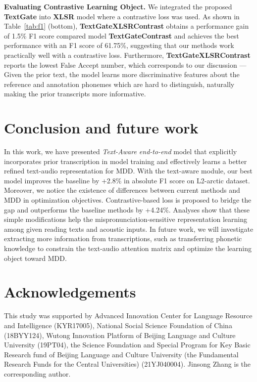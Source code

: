 \documentclass[a4paper]{article}
\begin{document}
\noindent \textbf{Evaluating Contrastive Learning Object.}
We integrated the proposed \textbf{TextGate} into \textbf{XLSR} model where a contrastive loss was used. As shown in Table~\ref{tab:f1} (bottom), \textbf{TextGateXLSRContrast} obtains a performance gain of 1.5\% F1 score compared model \textbf{TextGateContrast} and achieves the best performance with an F1 score of 61.75\%, suggesting that our methods work practically well with a contrastive loss. Furthermore, \textbf{TextGateXLSRContrast} reports the lowest False Accept number, which corresponds to our discussion — Given the prior text, the model learns more discriminative features about the reference and annotation phonemes which are hard to distinguish, naturally making the prior transcripts more informative.
\section{Conclusion and future work}

In this work, we have presented \emph{Text-Aware end-to-end} model that explicitly incorporates prior transcription in model training and effectively learns a better refined text-audio representation for MDD. With the text-aware module, our best model improves the baseline by +2.8\% in absolute F1 score on L2-arctic dataset. Moreover, we notice the existence of differences between current methods and MDD in optimization objectives. Contrastive-based loss is proposed to bridge the gap and outperforms the baseline methods by +4.24\%. Analyses show that these simple modifications help the mispronunciation-sensitive representation learning among given reading texts and acoustic inputs. In future work, we will investigate  extracting more information from transcriptions, such as transferring phonetic knowledge to constrain the text-audio attention matrix and optimize the learning object toward MDD. 

\section{Acknowledgements}

This study was supported by Advanced Innovation Center for Language Resource and Intelligence (KYR17005), National Social Science Foundation of China (18BYY124), Wutong Innovation Platform of Beijing Language and Culture University (19PT04), the Science Foundation and Special Program for Key Basic Research fund of Beijing Language and Culture University (the Fundamental Research Funds for the Central Universities) (21YJ040004). Jinsong Zhang is the corresponding author.
\end{document}
